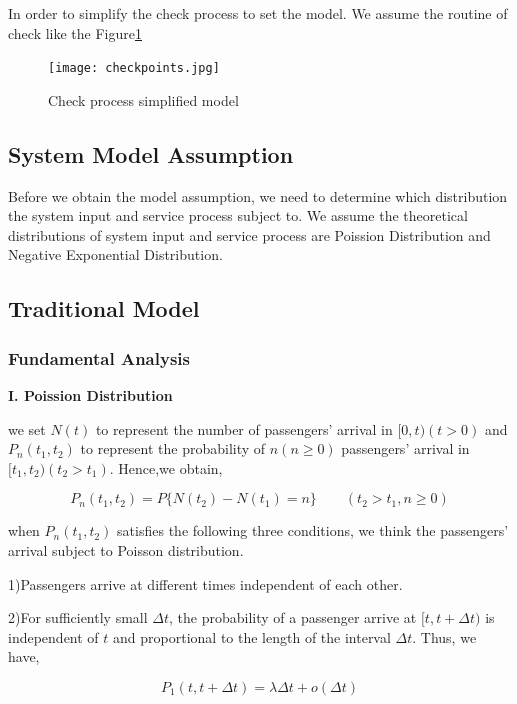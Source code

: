 \documentclass{mcmthesis}
\begin{document}
In order to simplify the check process to set the model. We assume the routine of check like the Figure\ref{arch} 

\begin{figure}[htbp]   
  \centering
  \texttt{[image: checkpoints.jpg]} 
  \caption{Check process simplified model}
   \label{arch}
\end{figure}

\subsection{System Model Assumption}%
Before we obtain the model assumption, we need to determine which distribution the system input and service process subject to. We assume the theoretical distributions of system input and service process are Poission Distribution and Negative Exponential Distribution.
\subsection{Traditional Model}%
\subsubsection{Fundamental Analysis}%
\par{\bf I. Poission  Distribution}%
\par we set $ N(t) $ to represent the number of passengers'  arrival in $ [0,t)(t>0) $ and $ P_n(t_1,t_2) $
to represent the probability of $ n(n\geqslant 0) $ passengers'  arrival  in $ [t_1,t_2)(t_2>t_1) $. Hence,we obtain,

\begin{equation}
P_n(t_1,t_2)=P\{  N(t_2)-N(t_1) =n \} \qquad (t_2>t_1,n\geqslant 0)
\end{equation}

when $P_n(t_1,t_2)$ satisfies the following three conditions, we think the passengers'  arrival subject to Poisson distribution.
\par 1)Passengers arrive at different times independent of each other.
\par 2)For sufficiently small $\Delta t$, the probability of a passenger arrive at $[t,t+\Delta t)$ is independent of $t$ and proportional to the length of the interval  $\Delta t$.
Thus, we have,

\begin{equation}
P_1(t,t+\Delta t)=\lambda \Delta t+o(\Delta t)  \label{e2}
\end{equation}
\end{document}
